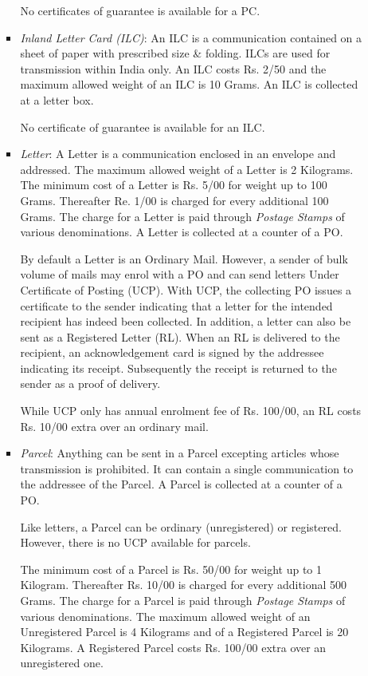 \documentclass{article}
\begin{document}
\begin{enumerate}
\begin{enumerate}
\begin{itemize}
No certificates of guarantee is available for a PC. 

\item {\em Inland Letter Card (ILC)}: An ILC is a communication contained on a sheet of paper with prescribed size \& folding. ILCs are used for transmission within India only. An ILC costs Rs. 2/50 and the maximum allowed weight of an ILC is 10 Grams. An ILC is collected at a letter box.

No certificate of guarantee is available for an ILC. 

\item {\em Letter}: A Letter is a communication enclosed in an envelope and addressed. The maximum allowed weight of a Letter is 2 Kilograms. The minimum cost of a Letter is Rs. 5/00 for weight up to 100 Grams. Thereafter Re. 1/00 is charged for every additional 100 Grams. The charge for a Letter is paid through {\em Postage Stamps} of various denominations. A Letter is collected at a counter of a PO.

By default a Letter is an Ordinary Mail. However, a sender of bulk volume of mails may enrol with a PO and can send letters Under Certificate of Posting (UCP). With UCP, the collecting PO issues a certificate to the sender indicating that a letter for the intended recipient has indeed been collected. In addition, a letter can also be sent as a Registered Letter (RL). When an RL is delivered to the recipient, an acknowledgement card is signed by the addressee indicating its receipt. Subsequently the receipt is returned to the sender as a proof of delivery. 

While UCP only has annual enrolment fee of Rs. 100/00, an RL costs Rs. 10/00 extra over an ordinary mail.
 
\item {\em Parcel}: Anything can be sent in a Parcel excepting articles whose transmission is prohibited. It can contain a single communication to the addressee of the Parcel. A Parcel is collected at a counter of a PO.

Like letters, a Parcel can be ordinary (unregistered) or registered. However, there is no UCP available for parcels.

The minimum cost of a Parcel is Rs. 50/00 for weight up to 1 Kilogram. Thereafter Rs. 10/00 is charged for every additional 500 Grams. The charge for a Parcel is paid through {\em Postage Stamps} of various denominations. The maximum allowed weight of an Unregistered Parcel is 4 Kilograms and of a Registered Parcel is 20 Kilograms. A Registered Parcel costs Rs. 100/00 extra over an unregistered one.


\end{itemize}
\end{enumerate}
\end{enumerate}
\end{document}
